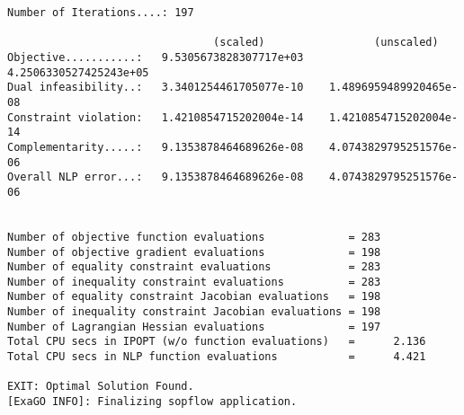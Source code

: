 \begin{lstlisting}
Number of Iterations....: 197

                                (scaled)                 (unscaled)
Objective...........:   9.5305673828307717e+03    4.2506330527425243e+05
Dual infeasibility..:   3.3401254461705077e-10    1.4896959489920465e-08
Constraint violation:   1.4210854715202004e-14    1.4210854715202004e-14
Complementarity.....:   9.1353878464689626e-08    4.0743829795251576e-06
Overall NLP error...:   9.1353878464689626e-08    4.0743829795251576e-06


Number of objective function evaluations             = 283
Number of objective gradient evaluations             = 198
Number of equality constraint evaluations            = 283
Number of inequality constraint evaluations          = 283
Number of equality constraint Jacobian evaluations   = 198
Number of inequality constraint Jacobian evaluations = 198
Number of Lagrangian Hessian evaluations             = 197
Total CPU secs in IPOPT (w/o function evaluations)   =      2.136
Total CPU secs in NLP function evaluations           =      4.421

EXIT: Optimal Solution Found.
[ExaGO INFO]: Finalizing sopflow application.
\end{lstlisting}

